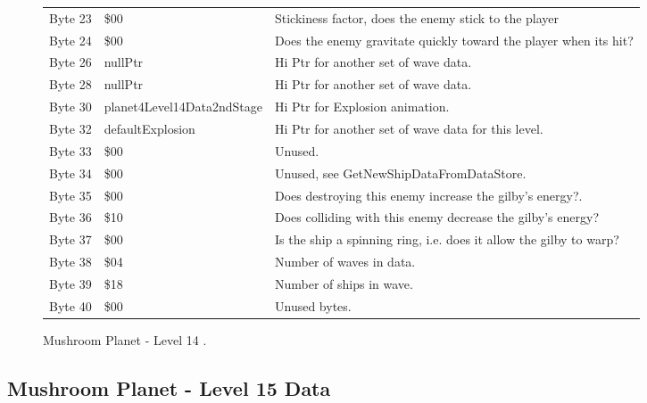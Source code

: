 \begin{figure}[H]
{\begin{adjustbox}{width=12cm}
\begin{tabular}{lll}
 Byte 23 & \$00                        & Stickiness factor, does the enemy stick to the player              \\
 Byte 24 & \$00                        & Does the enemy gravitate quickly toward the player when its hit?   \\
 Byte 26 & nullPtr                    & Hi Ptr for another set of wave data.                               \\
 Byte 28 & nullPtr                    & Hi Ptr for another set of wave data.                               \\
 Byte 30 & planet4Level14Data2ndStage & Hi Ptr for Explosion animation.                                    \\
 Byte 32 & defaultExplosion           & Hi Ptr for another set of wave data for this level.                \\
 Byte 33 & \$00                        & Unused.                                                            \\
 Byte 34 & \$00                        & Unused, see GetNewShipDataFromDataStore.                           \\
 Byte 35 & \$00                        & Does destroying this enemy increase the gilby's energy?.           \\
 Byte 36 & \$10                        & Does colliding with this enemy decrease the gilby's energy?        \\
 Byte 37 & \$00                        & Is the ship a spinning ring, i.e. does it allow the gilby to warp? \\
 Byte 38 & \$04                        & Number of waves in data.                                           \\
 Byte 39 & \$18                        & Number of ships in wave.                                           \\
 Byte 40 & \$00                        & Unused bytes.                                                      \\
\bottomrule
\end{tabular}

  \end{adjustbox}

  }\caption*{Mushroom Planet - Level 14
.}
\end{figure}

\clearpage
\subsection{Mushroom Planet - Level 15 Data}

